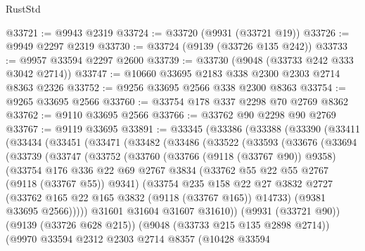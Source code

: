 \begin{lexlean}{RustStd}
\begin{coremodule}
@33721 := @9943 @2319
@33724 := @33720 (@9931 (@33721 @19))
@33726 := @9949 @2297 @2319
@33730 := @33724 (@9139 (@33726 @135 @242))
@33733 := @9957 @33594 @2297 @2600
@33739 := @33730 (@9048 (@33733 @242 @333 @3042 @2714))
@33747 := @10660 @33695 @2183 @338 @2300 @2303 @2714 @8363 @2326
@33752 := @9256 @33695 @2566 @338 @2300 @8363
@33754 := @9265 @33695 @2566
@33760 := @33754 @178 @337 @2298 @70 @2769 @8362
@33762 := @9110 @33695 @2566
@33766 := @33762 @90 @2298 @90 @2769
@33767 := @9119 @33695
@33891 := @33345
    (@33386
      (@33388
        (@33390
          (@33411
            (@33434
              (@33451
                (@33471
                  (@33482
                    (@33486
                      (@33522
                        (@33593
                          (@33676
                            (@33694
                              (@33739
                                (@33747
                                  (@33752
                                    (@33760
                                      (@33766 (@9118 (@33767 @90)) @9358)
                                      (@33754
                                        @176
                                        @336
                                        @22
                                        @69
                                        @2767
                                        @3834
                                        (@33762 @55 @22 @55 @2767 (@9118 (@33767 @55)) @9341)
                                        (@33754
                                          @235
                                          @158
                                          @22
                                          @27
                                          @3832
                                          @2727
                                          (@33762 @165 @22 @165 @3832 (@9118 (@33767 @165)) @14733)
                                          (@9381 @33695 @2566)))))
                                  @31601
                                  @31604
                                  @31607
                                  @31610))
                              (@9931 (@33721 @90))
                              (@9139 (@33726 @628 @215))
                              (@9048 (@33733 @215 @135 @2898 @2714))
                              (@9970
                                @33594
                                @2312
                                @2303
                                @2714
                                @8357
                                (@10428
                                  @33594

\end{coremodule}
\end{lexlean}
